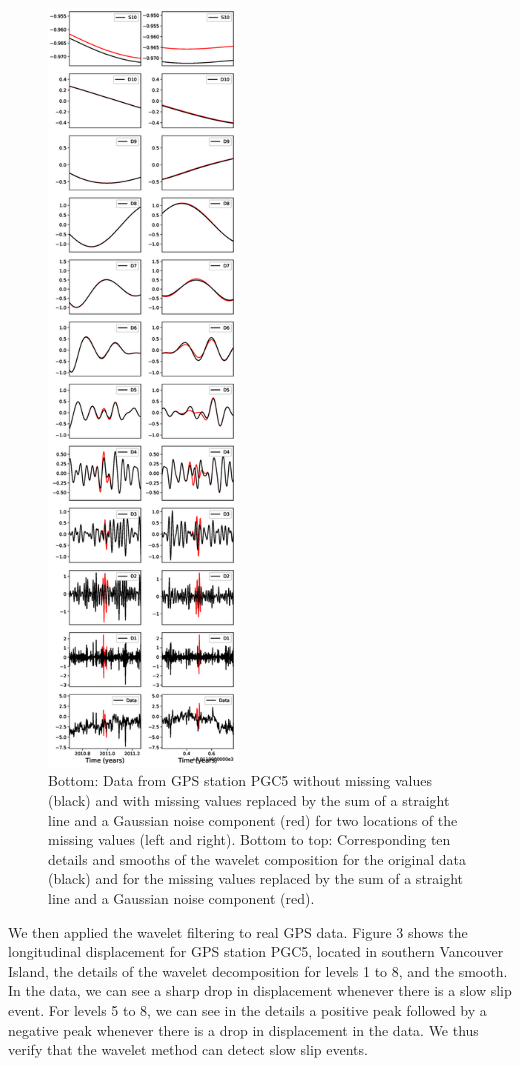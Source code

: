 \documentclass[draft]{agujournal2018}
\begin{document}
\begin{figure}
\noindent\includegraphics[width=5cm, trim={0cm 0cm 0cm 0cm},clip]{figures/DS_10.eps}
\caption{Bottom: Data from GPS station PGC5 without missing values (black) and with missing values replaced by the sum of a straight line and a Gaussian noise component (red) for two locations of the missing values (left and right). Bottom to top: Corresponding ten details and smooths of the wavelet composition for the original data (black) and for the missing values replaced by the sum of a straight line and a Gaussian noise component (red).}
\label{pngfiguresample}
\end{figure}

We then applied the wavelet filtering to real GPS data. Figure 3 shows the longitudinal displacement for GPS station PGC5, located in southern Vancouver Island, the details of the wavelet decomposition for levels 1 to 8, and the smooth. In the data, we can see a sharp drop in displacement whenever there is a slow slip event. For levels 5 to 8, we can see in the details a positive peak followed by a negative peak whenever there is a drop in displacement in the data. We thus verify that the wavelet method can detect slow slip events. \\
\end{document}

